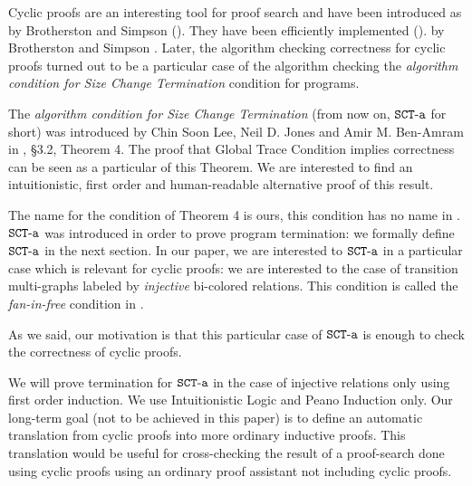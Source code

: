 \documentclass{lmcs}
\begin{document}
Cyclic proofs are an interesting tool for proof search and have been introduced as
by Brotherston and Simpson (\cite{BrotherstonSimpson}).
They have been efficiently implemented 
(\cite{10.1007/978-3-642-35182-2_25,10.1145/3632888, 10.1007/978-3-031-90643-5_18,  10.1145/3453483.3454087,  10.1145/3018610.3018623, Stratulat_2021, Brotherston2020}).
by Brotherston and Simpson \cite{BrotherstonSimpson}. 
Later, the algorithm checking correctness for cyclic proofs turned out to be
a particular case of the algorithm checking the 
\emph{algorithm condition for Size Change Termination} condition for programs. 

The \emph{algorithm condition for Size Change Termination}
(from now on, $\SCTa$ for short) was introduced by
Chin Soon Lee, Neil D. Jones and Amir M. Ben-Amram in \cite{Lee1}, 
\S 3.2, Theorem 4. The proof that Global Trace Condition implies correctness 
can be seen as a particular of this Theorem. We are interested to find
an intuitionistic, first order and human-readable alternative proof of this result. 

The name \quotationMarks{$\SCTa$} for the condition of Theorem 4 is ours, 
this condition has no name in \cite{Lee1}.
$\SCTa$ was introduced in order to prove program termination: 
we formally define $\SCTa$ in the next section.
In our paper, we are interested to $\SCTa$ in a particular case which is relevant for cyclic proofs:
we are interested to the case of transition multi-graphs labeled by 
\emph{injective} bi-colored relations. This condition is called 
the \emph{fan-in-free} condition in \cite{Lee2}.

As we said, our motivation is that this particular case of $\SCTa$ is enough to check 
the correctness of cyclic proofs. 


We will prove termination for $\SCTa$ in the case of injective relations only using 
first order induction. We use Intuitionistic Logic and Peano Induction only.
Our long-term goal (not to be achieved in this paper) is to define an automatic translation from 
cyclic proofs into more ordinary inductive proofs. This translation
would be useful for cross-checking the result of a proof-search done 
using cyclic proofs using an ordinary proof assistant not including cyclic proofs. 
\end{document}
